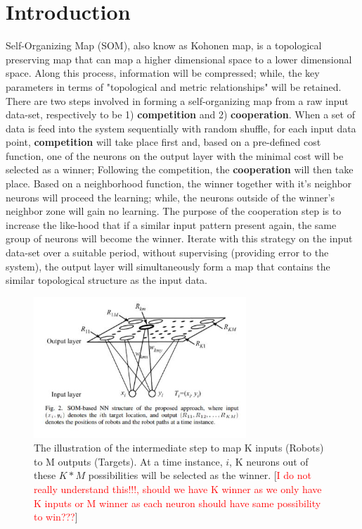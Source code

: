 \section{Introduction}
Self-Organizing Map (SOM), also know as Kohonen map, is a topological preserving map that can map a higher dimensional space to a lower dimensional space. Along this process, information will be compressed; while, the key parameters in terms of "topological and metric relationships"\cite{Kohonen1998} will be retained. 
\\
There are two steps involved in forming a self-organizing map from a raw input data-set\cite{hebbian2007}, respectively to be 1) \textbf{competition} and 2) \textbf{cooperation}. When a set of data is feed into the system sequentially with random shuffle, for each input data point, \textbf{competition} will take place first and, based on a pre-defined cost function, one of the neurons on the output layer with the minimal cost will be selected as a winner; Following the competition, the  \textbf{cooperation} will then take place. Based on a neighborhood function, the winner together with it's neighbor neurons will proceed the learning; while, the neurons outside of the winner's neighbor zone will gain no learning. The purpose of the cooperation step is to increase the like-hood that if a similar input pattern present again, the same group of neurons will become the winner. Iterate with this strategy on the input data-set over a suitable period, without supervising (providing error to the system), the output layer will simultaneously form a map that contains the similar topological structure as the input data. 



\begin{figure}[h]
  \centering
  \includegraphics[width=8cm]{Picture/AnminPic.JPG}
  \caption{The illustration of the intermediate step to map K inputs (Robots) to M outputs (Targets)\cite{zhu2006neural}. At a time instance, $i$, K neurons out of these $K*M$ possibilities will be selected as the winner. [\textcolor{red}{I do not really understand this!!!, should we have K winner as we only have K inputs or M winner as each neuron should have same possibility to win???}] }
\end{figure}

